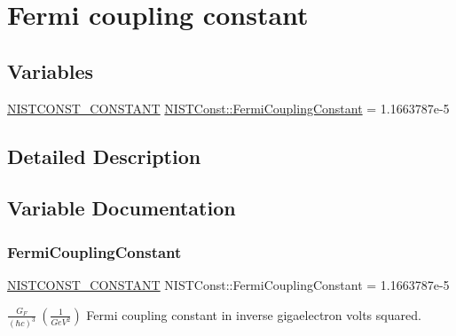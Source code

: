 \hypertarget{group___n_i_s_t_const-_fermi_coupling_constant}{}\section{Fermi coupling constant}
\label{group___n_i_s_t_const-_fermi_coupling_constant}
\subsection*{Variables}
\begin{DoxyCompactItemize}
\item 
\mbox{\hyperlink{group___n_i_s_t_const-_macros_ga2b0fc1d7452373f816175dd86ce26729}{N\+I\+S\+T\+C\+O\+N\+S\+T\+\_\+\+C\+O\+N\+S\+T\+A\+NT}} \mbox{\hyperlink{group___n_i_s_t_const-_fermi_coupling_constant_ga2bf2a03b5ea1bb506508e9c65b24dd52}{N\+I\+S\+T\+Const\+::\+Fermi\+Coupling\+Constant}} = 1.\+1663787e-\/5
\end{DoxyCompactItemize}


\subsection{Detailed Description}


\subsection{Variable Documentation}
\mbox{\label{group___n_i_s_t_const-_fermi_coupling_constant_ga2bf2a03b5ea1bb506508e9c65b24dd52}} 
\subsubsection{\texorpdfstring{Fermi\+Coupling\+Constant}{FermiCouplingConstant}}
{\footnotesize\ttfamily \mbox{\hyperlink{group___n_i_s_t_const-_macros_ga2b0fc1d7452373f816175dd86ce26729}{N\+I\+S\+T\+C\+O\+N\+S\+T\+\_\+\+C\+O\+N\+S\+T\+A\+NT}} N\+I\+S\+T\+Const\+::\+Fermi\+Coupling\+Constant = 1.\+1663787e-\/5}

$\frac{G_F}{(\hbar c)^3} \ (\frac{1}{GeV^2})$ Fermi coupling constant in inverse gigaelectron volts squared. 